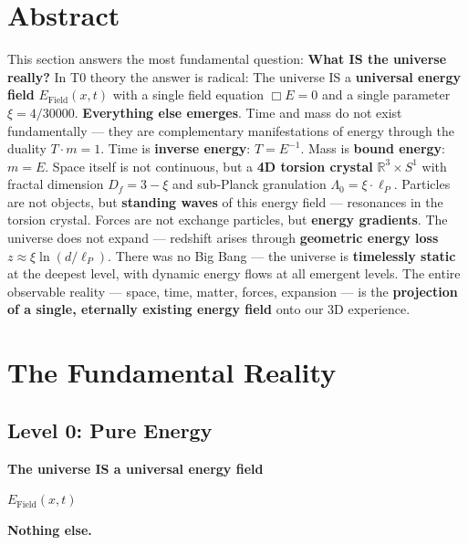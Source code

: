 \section*{Abstract}
		This section answers the most fundamental question: \textbf{What IS the universe really?} In T0 theory the answer is radical: The universe IS a \textbf{universal energy field} $E_{\text{Field}}(x,t)$ with a single field equation $\Box E = 0$ and a single parameter $\xi = 4/30000$. \textbf{Everything else emerges}. Time and mass do not exist fundamentally — they are complementary manifestations of energy through the duality $T \cdot m = 1$. Time is \textbf{inverse energy}: $T = E^{-1}$. Mass is \textbf{bound energy}: $m = E$. Space itself is not continuous, but a \textbf{4D torsion crystal} $\mathbb{R}^3 \times S^1$ with fractal dimension $D_f = 3-\xi$ and sub‑Planck granulation $\Lambda_0 = \xi \cdot \ell_P$. Particles are not objects, but \textbf{standing waves} of this energy field — resonances in the torsion crystal. Forces are not exchange particles, but \textbf{energy gradients}. The universe does not expand — redshift arises through \textbf{geometric energy loss} $z \approx \xi \ln(d/\ell_P)$. There was no Big Bang — the universe is \textbf{timelessly static} at the deepest level, with dynamic energy flows at all emergent levels. The entire observable reality — space, time, matter, forces, expansion — is the \textbf{projection of a single, eternally existing energy field} onto our 3D experience.

	
	\section{The Fundamental Reality}
	
	\subsection{Level 0: Pure Energy}
	
	\begin{revolutionary}[What the Universe IS]
		
		\begin{center}
			\textbf{The universe IS a universal energy field}
			
			\vspace{0.3cm}
			
			$E_{\text{Field}}(x,t)$
			
			\vspace{0.3cm}
			
			\textbf{Nothing else.}
		\end{center}
		\normalsize
	\end{revolutionary}
	
